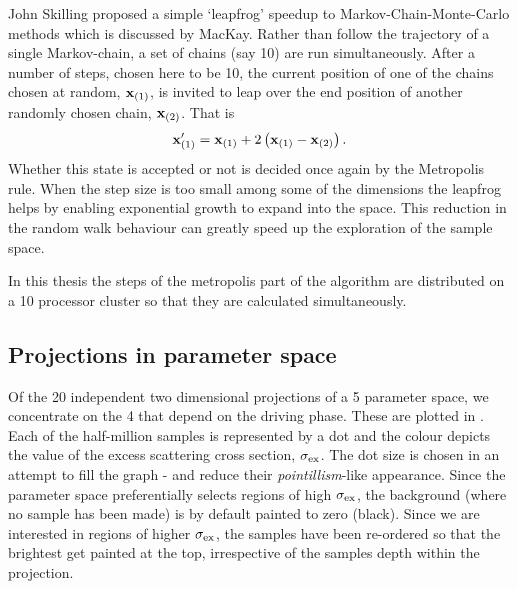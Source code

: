 John Skilling proposed a simple `leapfrog' speedup to Markov-Chain-Monte-Carlo methods
which is discussed by MacKay\cite{MacKayBook}.
Rather than follow the trajectory of a single Markov-chain,
a set of chains (say 10) are run  simultaneously.
After a number of steps, chosen here to be 10,
the current position of one of the  chains chosen at random, $\mathbf{x}_{(1)}$,  
is invited to leap over  the end position of another randomly chosen chain, $\mathbf{x}_{(2)}$.
That is
\begin{align}
 \mathbf{x}_{(1)}^\prime =\mathbf{x}_{(1)} + 2\left( \mathbf{x}_{(1)} -\mathbf{x}_{(2)}  \right).
\end{align}
Whether this state is accepted or not is decided once again by the Metropolis rule.
When the step size is too small among some of the dimensions the leapfrog helps by 
enabling exponential growth to expand into the space.
This reduction in the random walk behaviour can greatly speed up the exploration of the sample space.

In this thesis the steps of the metropolis part of the algorithm are distributed on a 10 processor cluster
so that they are calculated simultaneously.



\subsection{Projections in parameter space}


Of the 20 independent two dimensional projections of a 5 parameter space,
we  concentrate on the 4 that depend on the driving phase.
These are plotted in .
Each of the half-million samples is represented by a dot and the colour depicts the value of
the excess scattering cross section, $\sigma_\textrm{ex}$.
The dot size is chosen in an attempt to fill the graph -
and reduce their {\em pointillism}-like appearance.
Since the parameter space preferentially selects regions of high $\sigma_\textrm{ex}$, 
the background (where no sample has been made) is by default painted to zero (black).
Since we are interested in regions of higher $\sigma_\textrm{ex}$, 
the samples have been re-ordered so that the brightest get painted at the top,
irrespective of the samples depth within the projection.

